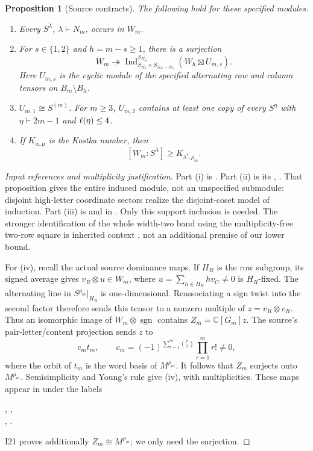 \documentclass[11pt]{article}
\newtheorem{proposition}[theorem]{Proposition}\newtheorem{lemma}[theorem]{Lemma}
\theoremstyle{remark}\newtheorem{remark}[theorem]{Remark}
\newcommand{\C}{\mathbb C}\newcommand{\Z}{\mathbb Z}
\newcommand{\sgn}{\operatorname{sgn}}\newcommand{\Ind}{\operatorname{Ind}}
\newcommand{\trp}{\mathsf t}\newcommand{\eps}{\varepsilon}
\numberwithin{equation}{section}\setlength{\emergencystretch}{2em}
\begin{document}
\begin{proposition}[Source contracts]\label{prop:contracts}
The following hold for these specified modules.
\begin{enumerate}[label=\textup{(\roman*)}]
\item Every $S^\lambda$, $\lambda\vdash N_m$, occurs in $W_m$.
\item For $s\in\{1,2\}$ and $h=m-s\ge1$, there is a surjection
\begin{equation}\label{eq:quotient}
 W_m\twoheadrightarrow
 \Ind_{S_{N_h}\times S_{N_m-N_h}}^{S_{N_m}}
       (W_h\boxtimes U_{m,s}).
\end{equation}
Here $U_{m,s}$ is the cyclic module of the specified alternating row and
column tensors on $B_m\setminus B_h$.
\item $U_{m,1}\cong S^{(m)}$. For $m\ge3$, $U_{m,2}$ contains at least
one copy of every $S^\eta$ with $\eta\vdash2m-1$ and $\ell(\eta)\le4$.
\item If $K_{\alpha,\mu}$ is the Kostka number, then
\begin{equation}\label{eq:Kbound}
 [W_m:S^\lambda]\ge K_{\lambda^{\trp},\rho_m}.
\end{equation}
\end{enumerate}
\end{proposition}
\begin{proof}[Input references and multiplicity justification]
Part (i) is \cite[, ]{cyclic}.
Part (ii) is its ,
. That proposition gives the entire induced
module, not an unspecified submodule: disjoint high-letter coordinate
sectors realize the disjoint-coset model of induction. Part (iii) is
 and  in
. Only this support inclusion is needed. The
stronger identification of the whole width-two band using the
multiplicity-free two-row square is inherited context \cite{I19,I21,BB},
not an additional premise of our lower bound.

For (iv), recall the actual source dominance maps. If $H_R$ is the row
subgroup, its signed average gives $v_R\otimes u\in W_m$, where
$u=\sum_{h\in H_R}h v_C\ne0$ is $H_R$-fixed. The alternating line in
$S^{\rho_m}|_{H_R}$ is one-dimensional. Reassociating a sign twist into
the second factor therefore sends this tensor to a nonzero multiple of
$z=v_R\otimes v_R$. Thus an isomorphic image of $W_m\otimes\sgn$
contains $Z_m=\C[G_m]z$.
The source's pair-letter/content projection sends $z$ to
\[
 c_m t_m,\qquad c_m=(-1)^{\sum_{r=1}^m\binom r2}\prod_{r=1}^m r!\ne0,
\]
where the orbit of $t_m$ is the word basis of $M^{\rho_m}$.
It follows that $Z_m$ surjects onto $M^{\rho_m}$. Semisimplicity and
Young's rule give (iv), with multiplicities. These maps appear in \cite{cyclic} under the labels
\begin{flushleft}\small
{}, ,\\
, .
\end{flushleft}
I21 proves additionally $Z_m\cong M^{\rho_m}$; we only need the surjection.
\end{proof}
\end{document}
